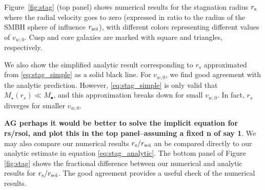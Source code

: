\documentclass[usenatbib,fleqn]{mn2e}
\newcommand{\rs}{r_s}
\newcommand{\Mstar}{M_{\star}}
\newcommand{\Mbh}[1][]{M_{\bullet#1}}
\newcommand{\vwO}{v_{w,0}}
\begin{document}
Figure~\ref{fig:stag} (top panel) shows numerical results for the
stagnation radius $r_{\rm s}$ where the radial velocity goes to zero
(expressed in ratio to the radius of the SMBH sphere of influence
$r_{\rm soi}$), with different colors representing different values of
$v_{w,0}$.  Cusp and core galaxies are marked with square and
triangles, respectively.

We also show the simplified analytic result corresponding to $\rs$
approximated from \eqref{eq:stag_simple} as a solid black line. For
$\vwO$, we find good agreement with the analytic prediction. However,
\eqref{eq:stag_simple} is only valid that $\Mstar(\rs) \ll \Mbh$, and
this approximation breaks down for small $\vwO$. In fact, $\rs$
diverges for smaller $\vwO$. 

{\bf AG perhaps it would be better to solve the implicit equation for
  rs/rsoi, and plot this in the top panel--assuming a fixed n of say
  1}. We may also compare our numerical results $r_{\rm s}/r_{\rm
  soi}$ an be compared directly to our analytic estimate in equation
\ref{eq:stag_analytic}.  The bottom panel of Figure \ref{fig:stag}
shows the fractional difference between our numerical and analytic
results for $r_{\rm s}/r_{\rm soi}$.  The good agreement provides a
useful check of the numerical results.

\end{document}
